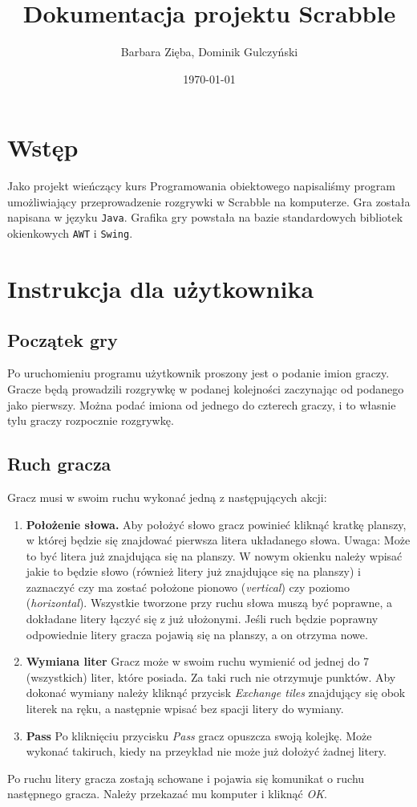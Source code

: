 \documentclass[a4paper]{article}
\author{Barbara Zięba, Dominik Gulczyński}
\title{Dokumentacja projektu Scrabble}
\date{\today}
\begin{document}
\maketitle
\section{Wstęp}
Jako projekt wieńczący kurs Programowania obiektowego napisaliśmy
program umożliwiający przeprowadzenie rozgrywki w Scrabble na
komputerze.
Gra została napisana w języku \texttt{Java}.
Grafika gry powstała na bazie standardowych bibliotek okienkowych \texttt{AWT} i \texttt{Swing}.
\section{Instrukcja dla użytkownika}
\subsection{Początek gry}
Po uruchomieniu programu użytkownik proszony jest o podanie imion graczy.
Gracze będą prowadzili rozgrywkę w podanej kolejności zaczynając od podanego jako pierwszy.
Można podać imiona od jednego do czterech graczy, i to własnie tylu graczy rozpocznie rozgrywkę.
\subsection{Ruch gracza}
Gracz musi w swoim ruchu wykonać jedną z następujących akcji:
\begin{enumerate}
\item[] \textbf{Położenie słowa.} 
Aby położyć słowo gracz powinieć kliknąć kratkę planszy, w której będzie się znajdować pierwsza litera układanego słowa. 
Uwaga: Może to być litera już znajdująca się na planszy.
W nowym okienku należy wpisać jakie to będzie słowo (również litery już znajdujące się na planszy)
i zaznaczyć czy ma zostać położone pionowo (\textit{vertical}) czy poziomo (\textit{horizontal}).
Wszystkie tworzone przy ruchu słowa muszą być poprawne, a dokładane litery łączyć się z już ułożonymi.
Jeśli ruch będzie poprawny odpowiednie litery gracza pojawią się na planszy, a on otrzyma nowe.
\item[] \textbf{Wymiana liter}
Gracz może w swoim ruchu wymienić od jednej do 7 (wszystkich) liter, które posiada.
Za taki ruch nie otrzymuje punktów. 
Aby dokonać wymiany należy kliknąć przycisk \textit{Exchange tiles} znajdujący się obok literek na ręku, a następnie wpisać bez spacji litery do wymiany.
\item[] \textbf{Pass}
Po kliknięciu przycisku \textit{Pass} gracz opuszcza swoją kolejkę.
Może wykonać takiruch, kiedy na przeykład nie może już dołożyć żadnej litery.
\end{enumerate}
Po ruchu litery gracza zostają schowane i pojawia się komunikat o ruchu następnego gracza.
Należy przekazać mu komputer i kliknąć \textit{OK}.
\end{document}
